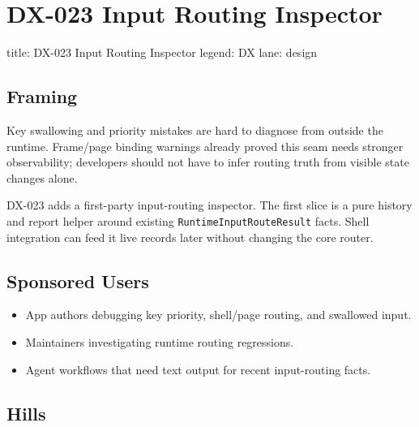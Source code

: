 \chapter{DX-023 Input Routing Inspector}\label{record-123}

\smallskip

\begin{RecordMeta}
title: DX-023 Input Routing Inspector
legend: DX
lane: design

\end{RecordMeta}

\section{Framing}\label{record-123-framing}

Key swallowing and priority mistakes are hard to diagnose from outside the runtime. Frame/page binding warnings already proved this seam needs stronger observability; developers should not have to infer routing truth from visible state changes alone.

DX-023 adds a first-party input-routing inspector. The first slice is a pure history and report helper around existing \texttt{R\allowbreak{}u\allowbreak{}n\allowbreak{}t\allowbreak{}i\allowbreak{}m\allowbreak{}e\allowbreak{}I\allowbreak{}n\allowbreak{}p\allowbreak{}u\allowbreak{}t\allowbreak{}R\allowbreak{}o\allowbreak{}u\allowbreak{}t\allowbreak{}e\allowbreak{}R\allowbreak{}e\allowbreak{}s\allowbreak{}u\allowbreak{}l\allowbreak{}t} facts. Shell integration can feed it live records later without changing the core router.

\section{Sponsored Users}\label{record-123-sponsored-users}

\begin{itemize}
\tightlist
\item
  App authors debugging key priority, shell/page routing, and swallowed input.
\item
  Maintainers investigating runtime routing regressions.
\item
  Agent workflows that need text output for recent input-routing facts.
\end{itemize}

\section{Hills}\label{record-123-hills}

